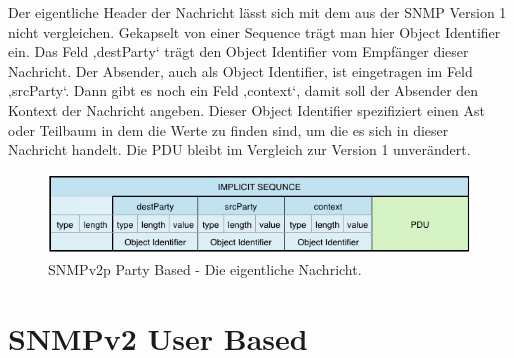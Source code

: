 \documentclass[11pt,a4paper]{article}
\begin{document}
Der eigentliche Header der Nachricht lässt sich mit dem aus der SNMP Version 1 nicht vergleichen. Gekapselt von einer Sequence trägt man hier Object Identifier ein. Das Feld ‚destParty‘ trägt den Object Identifier vom Empfänger dieser Nachricht. Der Absender, auch als Object Identifier, ist eingetragen im Feld ‚srcParty‘. Dann gibt es noch ein Feld ‚context‘, damit soll der Absender den Kontext der Nachricht angeben. Dieser Object Identifier spezifiziert einen Ast oder Teilbaum in dem die Werte zu finden sind, um die es sich in dieser Nachricht handelt. Die PDU bleibt im Vergleich zur Version 1 unverändert.\\
\begin{figure}[h]
	\centering
	\includegraphics[scale=.8]{Bilder/SNMPv2p-Message}
	\caption{SNMPv2p Party Based - Die eigentliche Nachricht.}
\end{figure}

\section{SNMPv2 User Based}
\end{document}
